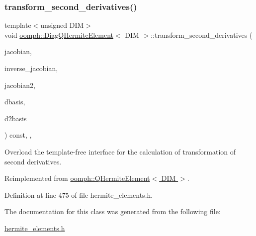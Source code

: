 \subsubsection{\texorpdfstring{transform\+\_\+second\+\_\+derivatives()}{transform\_second\_derivatives()}}
{\footnotesize\ttfamily template$<$unsigned D\+IM$>$ \\
void \hyperlink{classoomph_1_1DiagQHermiteElement}{oomph\+::\+Diag\+Q\+Hermite\+Element}$<$ D\+IM $>$\+::transform\+\_\+second\+\_\+derivatives (\begin{DoxyParamCaption}\item[{const \hyperlink{classoomph_1_1DenseMatrix}{Dense\+Matrix}$<$ double $>$ \&}]{jacobian,  }\item[{const \hyperlink{classoomph_1_1DenseMatrix}{Dense\+Matrix}$<$ double $>$ \&}]{inverse\+\_\+jacobian,  }\item[{const \hyperlink{classoomph_1_1DenseMatrix}{Dense\+Matrix}$<$ double $>$ \&}]{jacobian2,  }\item[{\hyperlink{classoomph_1_1DShape}{D\+Shape} \&}]{dbasis,  }\item[{\hyperlink{classoomph_1_1DShape}{D\+Shape} \&}]{d2basis }\end{DoxyParamCaption}) const\hspace{0.3cm}{\ttfamily [inline]}, {\ttfamily [protected]}, {\ttfamily [virtual]}}



Overload the template-\/free interface for the calculation of transformation of second derivatives. 



Reimplemented from \hyperlink{classoomph_1_1QHermiteElement_a0f000889085286deef3b273043522834}{oomph\+::\+Q\+Hermite\+Element$<$ D\+I\+M $>$}.



Definition at line 475 of file hermite\+\_\+elements.\+h.



The documentation for this class was generated from the following file\+:\begin{DoxyCompactItemize}
\item 
\hyperlink{hermite__elements_8h}{hermite\+\_\+elements.\+h}\end{DoxyCompactItemize}
